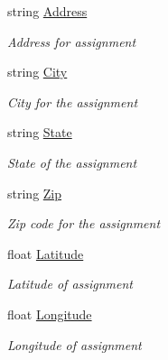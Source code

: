 \begin{DoxyCompactItemize}
string \hyperlink{class_field_service_1_1_data_1_1_assignment_a886d3c71c11ae05b2dca152f02d3070e}{Address}
\begin{DoxyCompactList}\small\item\em Address for assignment \end{DoxyCompactList}\item 
string \hyperlink{class_field_service_1_1_data_1_1_assignment_a3ed50f43dafb1448873406a4856b06c0}{City}
\begin{DoxyCompactList}\small\item\em City for the assignment \end{DoxyCompactList}\item 
string \hyperlink{class_field_service_1_1_data_1_1_assignment_a16eb6a19c1c9fdb1792cff2ad0993120}{State}
\begin{DoxyCompactList}\small\item\em State of the assignment \end{DoxyCompactList}\item 
string \hyperlink{class_field_service_1_1_data_1_1_assignment_ab8434715ad43a721ed1b7b53b9faeca1}{Zip}
\begin{DoxyCompactList}\small\item\em Zip code for the assignment \end{DoxyCompactList}\item 
float \hyperlink{class_field_service_1_1_data_1_1_assignment_aa14382e3a7da3b85825d3e6f7568106b}{Latitude}
\begin{DoxyCompactList}\small\item\em Latitude of assignment \end{DoxyCompactList}\item 
float \hyperlink{class_field_service_1_1_data_1_1_assignment_adee085d31938622d1d932efb03fb3233}{Longitude}
\begin{DoxyCompactList}\small\item\em Longitude of assignment \end{DoxyCompactList}\item 

\end{DoxyCompactItemize}
